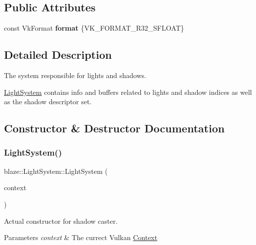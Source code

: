 \subsection*{Public Attributes}
\begin{DoxyCompactItemize}
\item 
\mbox{\label{classblaze_1_1LightSystem_a56804a3db8557bf475477e71a45ffca3}} 
const Vk\+Format {\bfseries format} \{V\+K\+\_\+\+F\+O\+R\+M\+A\+T\+\_\+\+R32\+\_\+\+S\+F\+L\+O\+AT\}
\end{DoxyCompactItemize}


\subsection{Detailed Description}
The system responsible for lights and shadows. 

\hyperlink{classblaze_1_1LightSystem}{Light\+System} contains info and buffers related to lights and shadow indices as well as the shadow descriptor set. 

\subsection{Constructor \& Destructor Documentation}
\mbox{\label{classblaze_1_1LightSystem_a67835433d9ae788824ead52db19a2262}} 
\subsubsection{\texorpdfstring{Light\+System()}{LightSystem()}}
{\footnotesize\ttfamily blaze\+::\+Light\+System\+::\+Light\+System (\begin{DoxyParamCaption}\item[{const \hyperlink{classblaze_1_1Context}{Context} \&}]{context }\end{DoxyParamCaption})\hspace{0.3cm}{\ttfamily [noexcept]}}



Actual constructor for shadow caster. 


\begin{DoxyParams}{Parameters}
{\em context} & The currect Vulkan \hyperlink{classblaze_1_1Context}{Context} \\
\hline
\end{DoxyParams}


